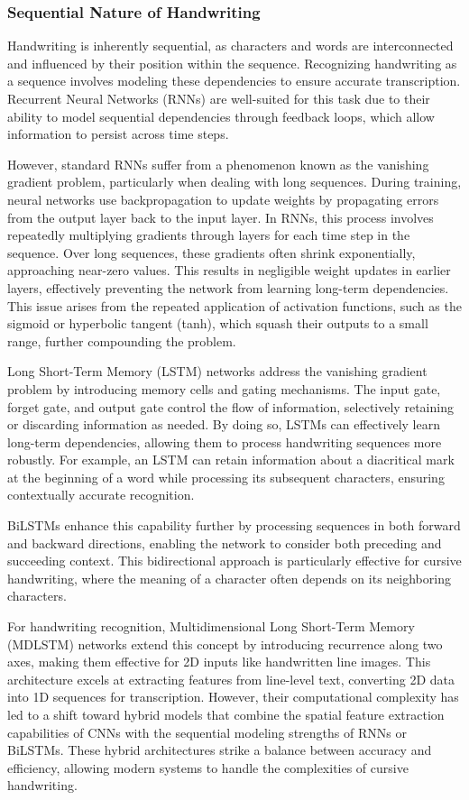 \documentclass[conference]{IEEEtran}
\begin{document}
\subsubsection{Sequential Nature of Handwriting}

Handwriting is inherently sequential, as characters and words are interconnected and influenced by their position within the sequence. Recognizing handwriting as a sequence involves modeling these dependencies to ensure accurate transcription. Recurrent Neural Networks (RNNs) are well-suited for this task due to their ability to model sequential dependencies through feedback loops, which allow information to persist across time steps. 


However, standard RNNs suffer from a phenomenon known as the vanishing gradient problem, particularly when dealing with long sequences. During training, neural networks use backpropagation to update weights by propagating errors from the output layer back to the input layer. In RNNs, this process involves repeatedly multiplying gradients through layers for each time step in the sequence. Over long sequences, these gradients often shrink exponentially, approaching near-zero values. This results in negligible weight updates in earlier layers, effectively preventing the network from learning long-term dependencies. This issue arises from the repeated application of activation functions, such as the sigmoid or hyperbolic tangent (tanh), which squash their outputs to a small range, further compounding the problem.

Long Short-Term Memory (LSTM) networks address the vanishing gradient problem by introducing memory cells and gating mechanisms. The input gate, forget gate, and output gate control the flow of information, selectively retaining or discarding information as needed. By doing so, LSTMs can effectively learn long-term dependencies, allowing them to process handwriting sequences more robustly. For example, an LSTM can retain information about a diacritical mark at the beginning of a word while processing its subsequent characters, ensuring contextually accurate recognition.

BiLSTMs enhance this capability further by processing sequences in both forward and backward directions, enabling the network to consider both preceding and succeeding context. This bidirectional approach is particularly effective for cursive handwriting, where the meaning of a character often depends on its neighboring characters.

For handwriting recognition, Multidimensional Long Short-Term Memory (MDLSTM) networks extend this concept by introducing recurrence along two axes, making them effective for 2D inputs like handwritten line images. This architecture excels at extracting features from line-level text, converting 2D data into 1D sequences for transcription. However, their computational complexity has led to a shift toward hybrid models that combine the spatial feature extraction capabilities of CNNs with the sequential modeling strengths of RNNs or BiLSTMs. These hybrid architectures strike a balance between accuracy and efficiency, allowing modern systems to handle the complexities of cursive handwriting.
\end{document}
